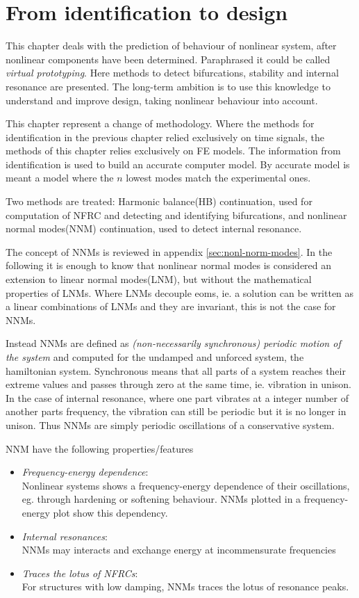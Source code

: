 
\chapter{From identification to design}
\label{chap:ident_to_design}

This chapter deals with the prediction of behaviour of nonlinear system, after
nonlinear components have been determined. Paraphrased it could be called
\textit{virtual prototyping}. Here methods to detect bifurcations, stability and
internal resonance are presented. The long-term ambition is to use this
knowledge to understand and improve design, taking nonlinear behaviour into
account.


This chapter represent a change of methodology. Where the methods for
identification in the previous chapter relied exclusively on time signals, the
methods of this chapter relies exclusively on FE models.
The information from identification is used to build
an accurate computer model.
By accurate model is meant a model where the $n$ lowest modes match
the experimental ones.


Two methods are treated: Harmonic balance(HB) continuation, used for computation
of NFRC and detecting and identifying bifurcations, and nonlinear normal
modes(NNM) continuation, used to detect internal resonance.

The concept of NNMs is reviewed in appendix \ref{sec:nonl-norm-modes}. In the
following it is enough to know that nonlinear normal modes is considered an
extension to linear normal modes(LNM), but without the mathematical properties
of LNMs. Where LNMs decouple eoms, ie. a solution can be written as a linear
combinations of LNMs and they are invariant, this is not the case for NNMs.

Instead NNMs are defined as \textit{(non-necessarily synchronous) periodic
  motion of the system}\autocite{kerschen2009a} and computed for the undamped
and unforced system, the hamiltonian system.
Synchronous means that all parts of a system reaches their extreme values and
passes through zero at the same time, ie. vibration in unison.
In the case of internal resonance, where one part vibrates at a integer number
of another parts frequency, the vibration can still be periodic but it is no
longer in unison. Thus NNMs are simply periodic oscillations of a conservative
system.

NNM have the following properties/features
\begin{itemize}
\item \textit{Frequency-energy dependence}:\\
  Nonlinear systems shows a frequency-energy dependence of their oscillations,
  eg. through hardening or softening behaviour. NNMs plotted in a
  frequency-energy plot show this dependency.
\item \textit{Internal resonances}:\\
  NNMs may interacts and exchange energy at incommensurate frequencies
\item \textit{Traces the lotus of NFRCs}:\\
  For structures with low damping, NNMs traces the lotus of resonance peaks.
\end{itemize}




